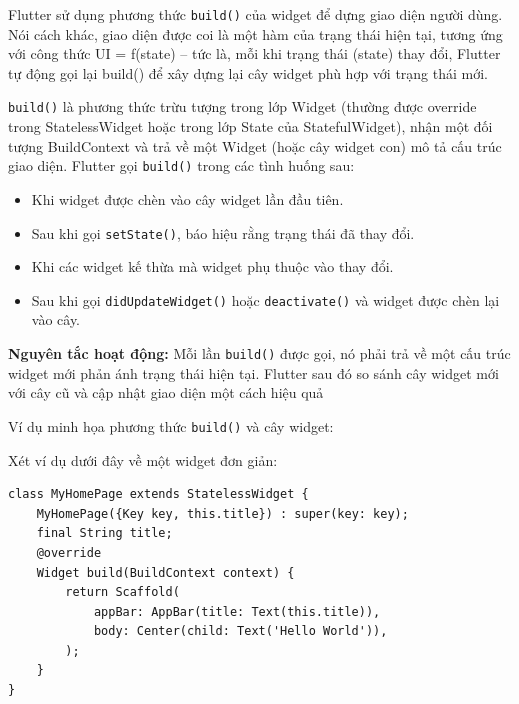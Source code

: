 \documentclass[../DoAn.tex]{subfiles}
\numberwithin{figure}{chapter}
\begin{document}
Flutter sử dụng phương thức \texttt{build()} của widget để dựng giao diện người dùng. Nói cách khác, giao diện được coi là một hàm của trạng thái hiện tại, tương ứng với công thức UI = f(state) – tức là, mỗi khi trạng thái (state) thay đổi, Flutter tự động gọi lại build() để xây dựng lại cây widget phù hợp với trạng thái mới. 

\texttt{build()} là phương thức trừu tượng trong lớp Widget (thường được override trong StatelessWidget hoặc trong lớp State của StatefulWidget), nhận một đối tượng BuildContext và trả về một Widget (hoặc cây widget con) mô tả cấu trúc giao diện. Flutter gọi \texttt{build()} trong các tình huống sau:
\begin{itemize}
\item Khi widget được chèn vào cây widget lần đầu tiên.
\item Sau khi gọi \texttt{setState()}, báo hiệu rằng trạng thái đã thay đổi.
\item Khi các widget kế thừa mà widget phụ thuộc vào thay đổi.
\item Sau khi gọi \texttt{didUpdateWidget()} hoặc \texttt{deactivate()} và widget được chèn lại vào cây.
\end{itemize}
\textbf{Nguyên tắc hoạt động:} Mỗi lần \texttt{build()} được gọi, nó phải trả về một cấu trúc widget mới phản ánh trạng thái hiện tại. Flutter sau đó so sánh cây widget mới với cây cũ và cập nhật giao diện một cách hiệu quả 

Ví dụ minh họa phương thức \texttt{build()} và cây widget:

Xét ví dụ dưới đây về một widget đơn giản:
\begin{lstlisting}
class MyHomePage extends StatelessWidget {
    MyHomePage({Key key, this.title}) : super(key: key);
    final String title;
    @override
    Widget build(BuildContext context) {
        return Scaffold(
            appBar: AppBar(title: Text(this.title)),
            body: Center(child: Text('Hello World')),
        );
    }
}    
\end{lstlisting}
\end{document}
